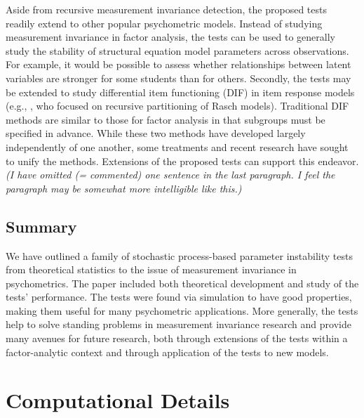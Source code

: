 \documentclass[man]{apa}
\newcommand{\readme}[1]{\emph{\marginpar{README} (#1)}}
\begin{document}
Aside from recursive measurement invariance detection, the proposed tests
readily extend to other popular psychometric models.  
Instead of studying measurement invariance in factor
analysis, the tests can be used to generally 
study the stability of structural equation model parameters across
observations.  For 
example, it would be possible to assess whether relationships between
latent variables are stronger for some students than for
others.  Secondly, 
the tests may be extended to study differential item functioning (DIF)
in item response models (e.g., , who focused on recursive
partitioning of Rasch models).  
Traditional DIF methods are similar to those for factor analysis in
that subgroups must be specified in advance.
While these two methods have developed largely independently of one another,
some treatments \cite{Mcd99} and recent research \cite{StaChe06} have
sought to unify the methods.  Extensions of the proposed tests can
support this endeavor.
\readme{I have omitted (= commented) one sentence in the last paragraph.
I feel the paragraph may be somewhat more intelligible like this.}

\subsection{Summary}
We have outlined a family of 
stochastic process-based parameter instability tests from theoretical
statistics to the issue of measurement invariance in psychometrics.
The paper included both theoretical development and 
study of the tests' performance.  The tests were found via simulation
to have good properties, making them useful for many psychometric
applications.  More generally, the tests help to
solve standing problems in
measurement invariance research and provide many avenues for
future research, both through extensions of the tests within a
factor-analytic context and through application of the tests to new
models.

\section*{Computational Details}
\end{document}
